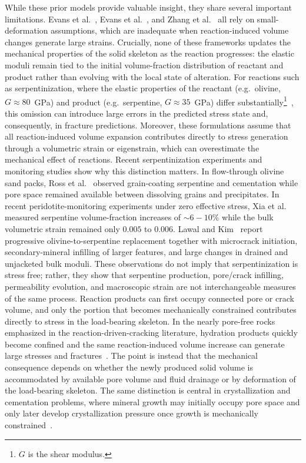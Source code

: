 \documentclass[11pt]{article}
\begin{document}
While these prior models provide valuable insight, they share several important limitations. Evans et al.~\cite{evans2018}, Evans et al.~\cite{evans2020phasefield}, and Zhang et al.~\cite{zhang2025} all rely on small-deformation assumptions, which are inadequate when reaction-induced volume changes generate large strains. Crucially, none of these frameworks updates the mechanical properties of the solid skeleton as the reaction progresses: the elastic moduli remain tied to the initial volume-fraction distribution of reactant and product rather than evolving with the local state of alteration. For reactions such as serpentinization, where the elastic properties of the reactant (e.g.\ olivine, $G \approx 80$~GPa) and product (e.g.\ serpentine, $G \approx 35$~GPa) differ substantially\footnote{$G$ is the shear modulus.}~\cite{murther2025}, this omission can introduce large errors in the predicted stress state and, consequently, in fracture predictions. Moreover, these formulations assume that all reaction-induced volume expansion contributes directly to stress generation through a volumetric strain or eigenstrain, which can overestimate the mechanical effect of reactions. Recent serpentinization experiments and monitoring studies show why this distinction matters. In flow-through olivine sand packs, Ross et al.~\cite{ross2025} observed grain-coating serpentine and cementation while pore space remained available between dissolving grains and precipitates. In recent peridotite-monitoring experiments under zero effective stress, Xia et al.~\cite{xia2026} measured serpentine volume-fraction increases of $\sim6-10\%$  while the bulk volumetric strain remained only $0.005$ to $0.006$. Lawal and Kim~\cite{lawal2026} report progressive olivine-to-serpentine replacement together with microcrack initiation, secondary-mineral infilling of larger features, and large changes in drained and unjacketed bulk moduli. These observations do not imply that serpentinization is stress free; rather, they show that serpentine production, pore/crack infilling, permeability evolution, and macroscopic strain are not interchangeable measures of the same process. Reaction products can first occupy connected pore or crack volume, and only the portion that becomes mechanically constrained contributes directly to stress in the load-bearing skeleton. In the nearly pore-free rocks emphasized in the reaction-driven-cracking literature, hydration products quickly become confined and the same reaction-induced volume increase can generate large stresses and fractures~\cite{jamtveit2000,kelemen2011reaction,plumper2012serpentine,malvoisin2017serpentinization}. The point is instead that the mechanical consequence depends on whether the newly produced solid volume is accommodated by available pore volume and fluid drainage or by deformation of the load-bearing skeleton. The same distinction is central in crystallization and cementation problems, where mineral growth may initially occupy pore space and only later develop crystallization pressure once growth is mechanically constrained~\cite{correns1949growth,scherer1999crystallization,coussy2006deformation,steiger2005crystal}.
\end{document}

